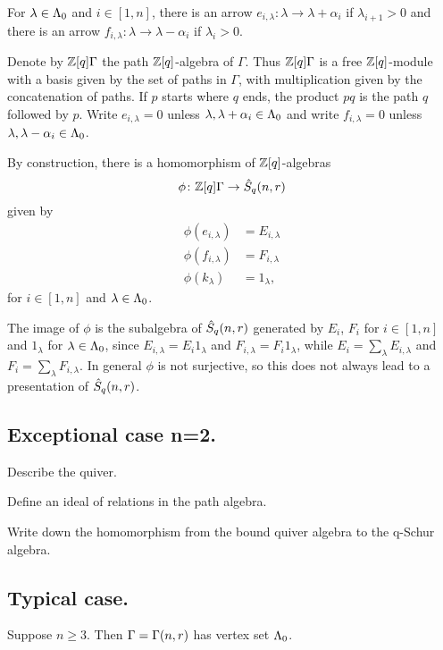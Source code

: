 \documentclass[a4paper, 11pt]{report}
\begin{document}
For $\lambda\in{\Lambda_0}$ and $i\in [1,n]$, there is an arrow $e_{i,\lambda}:\lambda\to\lambda +\alpha_i$ if $\lambda_{i+1}>0$ and there is an arrow $f_{i,\lambda}:\lambda\to\lambda -\alpha_i$ if $\lambda_i>0$.

Denote by $\mathbb{Z}[q]\Gamma$ the path $\mathbb{Z}[q]$-algebra of $\Gamma$. Thus $\mathbb{Z}[q]\Gamma$ is a free $\mathbb{Z}[q]$-module with a basis given by the set of paths in $\Gamma$, with multiplication given by the concatenation of paths. If $p$ starts where $q$ ends, the product $pq$ is the path $q$ followed by $p$. Write $e_{i,\lambda}=0$ unless $\lambda,\lambda+\alpha_i\in{\Lambda_0}$ and write $f_{i,\lambda}=0$ unless $\lambda,\lambda -\alpha_i\in{\Lambda_0}$.

By construction, there is a homomorphism of $\mathbb{Z}[q]$-algebras
\begin{equation*}
\phi\colon \mathbb{Z}[q]\Gamma\to\hat{S}_q(n,r)
\end{equation*}
given by
\begin{align*}
\phi(e_{i,\lambda}) &= E_{i,\lambda}\\
\phi(f_{i,\lambda}) &= F_{i,\lambda}\\
\phi(k_\lambda) &= 1_{\lambda},
\end{align*}
for $i\in [1,n]$ and $\lambda\in{\Lambda_0}$.

The image of $\phi$ is the subalgebra of $\hat{S}_q(n,r)$ generated by $E_i$, $F_i$ for $i\in [1,n]$ and $1_\lambda$ for $\lambda\in{\Lambda_0}$, since $E_{i,\lambda}=E_i1_\lambda$ and $F_{i,\lambda}=F_i1_\lambda$, while $E_i = \sum_\lambda E_{i,\lambda}$ and $F_i = \sum_\lambda F_{i,\lambda}$. In general $\phi$ is not surjective, so this does not always lead to a presentation of $\hat{S}_q(n,r)$.

\subsection{Exceptional case n=2.}

Describe the quiver.

Define an ideal of relations in the path algebra.

Write down the homomorphism from the bound quiver algebra to the q-Schur algebra.

\subsection{Typical case.}

Suppose $n\geq 3$. Then $\Gamma=\Gamma(n,r)$ has vertex set ${\Lambda_0}$.\seeyoulater
\end{document}
